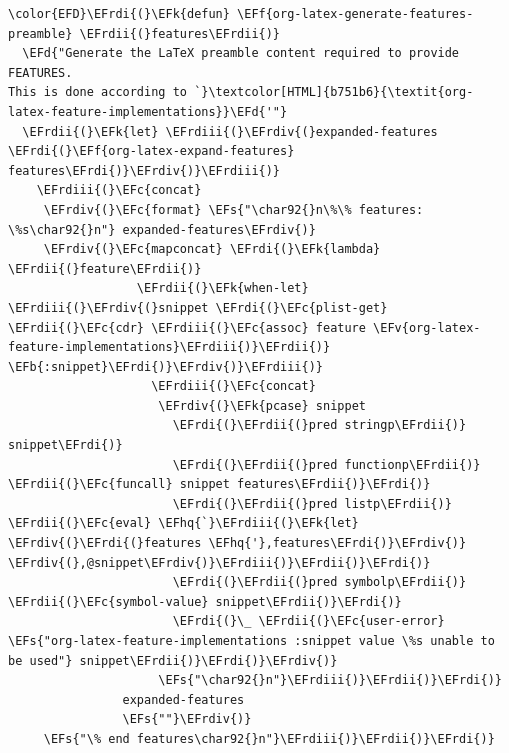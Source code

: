 \documentclass{scrartcl}
\newcommand{\EFk}[1]{\textcolor{EFk}{#1}} %
\newcommand{\EFd}[1]{\textcolor{EFd}{\textit{#1}}} %
\newcommand{\EFs}[1]{\textcolor{EFs}{#1}} %
\newcommand{\EFb}[1]{\textcolor{EFb}{#1}} %
\newcommand{\EFc}[1]{\textcolor{EFc}{#1}} %
\newcommand{\EFv}[1]{\textcolor{EFv}{#1}} %
\newcommand{\EFf}[1]{\textcolor{EFf}{#1}} %
\newcommand{\EFhq}[1]{\textcolor{EFhq}{#1}} %
\newcommand{\EFrdi}[1]{\textcolor{EFrdi}{#1}} %
\newcommand{\EFrdii}[1]{\textcolor{EFrdii}{#1}} %
\newcommand{\EFrdiii}[1]{\textcolor{EFrdiii}{#1}} %
\newcommand{\EFrdiv}[1]{\textcolor{EFrdiv}{#1}} %
\begin{document}
\begin{Code}
\begin{Verbatim}[]
\color{EFD}\EFrdi{(}\EFk{defun} \EFf{org-latex-generate-features-preamble} \EFrdii{(}features\EFrdii{)}
  \EFd{"Generate the LaTeX preamble content required to provide FEATURES.
This is done according to `}\textcolor[HTML]{b751b6}{\textit{org-latex-feature-implementations}}\EFd{'"}
  \EFrdii{(}\EFk{let} \EFrdiii{(}\EFrdiv{(}expanded-features \EFrdi{(}\EFf{org-latex-expand-features} features\EFrdi{)}\EFrdiv{)}\EFrdiii{)}
    \EFrdiii{(}\EFc{concat}
     \EFrdiv{(}\EFc{format} \EFs{"\char92{}n\%\% features: \%s\char92{}n"} expanded-features\EFrdiv{)}
     \EFrdiv{(}\EFc{mapconcat} \EFrdi{(}\EFk{lambda} \EFrdii{(}feature\EFrdii{)}
                  \EFrdii{(}\EFk{when-let} \EFrdiii{(}\EFrdiv{(}snippet \EFrdi{(}\EFc{plist-get} \EFrdii{(}\EFc{cdr} \EFrdiii{(}\EFc{assoc} feature \EFv{org-latex-feature-implementations}\EFrdiii{)}\EFrdii{)} \EFb{:snippet}\EFrdi{)}\EFrdiv{)}\EFrdiii{)}
                    \EFrdiii{(}\EFc{concat}
                     \EFrdiv{(}\EFk{pcase} snippet
                       \EFrdi{(}\EFrdii{(}pred stringp\EFrdii{)} snippet\EFrdi{)}
                       \EFrdi{(}\EFrdii{(}pred functionp\EFrdii{)} \EFrdii{(}\EFc{funcall} snippet features\EFrdii{)}\EFrdi{)}
                       \EFrdi{(}\EFrdii{(}pred listp\EFrdii{)} \EFrdii{(}\EFc{eval} \EFhq{`}\EFrdiii{(}\EFk{let} \EFrdiv{(}\EFrdi{(}features \EFhq{'},features\EFrdi{)}\EFrdiv{)} \EFrdiv{(},@snippet\EFrdiv{)}\EFrdiii{)}\EFrdii{)}\EFrdi{)}
                       \EFrdi{(}\EFrdii{(}pred symbolp\EFrdii{)} \EFrdii{(}\EFc{symbol-value} snippet\EFrdii{)}\EFrdi{)}
                       \EFrdi{(}\_ \EFrdii{(}\EFc{user-error} \EFs{"org-latex-feature-implementations :snippet value \%s unable to be used"} snippet\EFrdii{)}\EFrdi{)}\EFrdiv{)}
                     \EFs{"\char92{}n"}\EFrdiii{)}\EFrdii{)}\EFrdi{)}
                expanded-features
                \EFs{""}\EFrdiv{)}
     \EFs{"\% end features\char92{}n"}\EFrdiii{)}\EFrdii{)}\EFrdi{)}
\end{Verbatim}
\end{Code}
\end{document}
